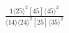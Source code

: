 \documentclass[varwidth, border=5pt]{standalone}
\begin{document}
\begin{my}
$\begin{gathered}
\scriptscriptstyle\frac{1⟨25⟩^2[45]⟨45⟩^2}{⟨14⟩⟨24⟩^2[25]⟨35⟩^2}
\end{gathered}$
\end{my}
\end{document}
